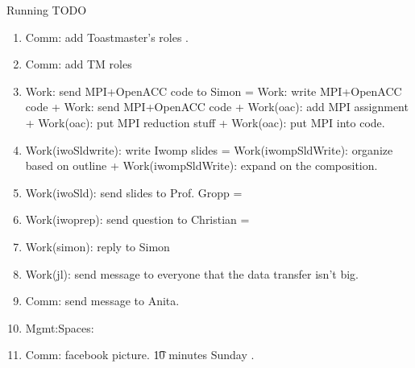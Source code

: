 \begin{frame}
\begin{columns}
\begin{column}{0.50\linewidth}
\begin{block}{Running TODO}
\begin{enumerate}


     
       

    \item \small Comm: add Toastmaster's roles .
    \item \small Comm: add TM roles   
      
      \small \item \small Work: send MPI+OpenACC code to Simon = Work: write
      MPI+OpenACC code + Work: send MPI+OpenACC code + Work(oac):  add
      MPI assignment + Work(oac): put MPI reduction stuff + Work(oac):
      put MPI into code. 



      \tiny \item \tiny Work(iwoSldwrite): write Iwomp slides =
      Work(iwompSldWrite): organize based on outline + 
      Work(iwompSldWrite): expand on the composition. 
       \item \tiny Work(iwoSld): send slides to Prof. Gropp =  
       \item \tiny Work(iwoprep): send question to Christian = 


       \item \tiny Work(simon): reply to Simon 

       \item \small Work(jl): send message to everyone that the 
         data transfer isn't big. 


       \item \tiny Comm: send message to Anita. 
          

       \item \tiny Mgmt:Spaces: 
       \item \tiny Comm: facebook picture. \t{10 minutes}  \d{ Sunday}
         . 



\end{enumerate}
\end{block}
\end{column}
\end{columns}
\end{frame}
